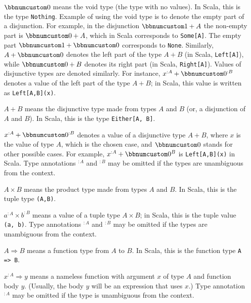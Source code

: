 $\bbnum 0$ means the void type (the type with no
values). In Scala, this is the type \lstinline!Nothing!.
Example of using the void type is to denote the empty part of a disjunction.
For example, in the disjunction $\bbnum 1+A$ the non-empty part is
$\bbnum 0+A$, which in Scala corresponds to \lstinline!Some[A]!.
The empty part $\bbnum 1+\bbnum 0$ corresponds to \lstinline!None!.
Similarly, $A+\bbnum 0$ denotes the left part of the type $A+B$
(in Scala, \lstinline!Left[A]!),
while $\bbnum 0+B$ denotes its right part (in Scala, \lstinline!Right[A]!).
Values of disjunctive types are denoted similarly. For instance, $x^{:A}+\bbnum 0^{:B}$
denotes a value of the left part of the type $A+B$; in Scala, this
value is written as \lstinline!Left[A,B](x)!.

$A+B$ means the disjunctive type made from types $A$ and $B$ (or,
a disjunction of $A$ and $B$). In Scala, this is the type \texttt{}\lstinline!Either[A, B]!.

$x^{:A}+\bbnum 0^{:B}$ denotes a value of a disjunctive type $A+B$,
where $x$ is the value of type $A$, which is the chosen case, and
$\bbnum 0$ stands for other possible cases. For example, $x^{:A}+\bbnum 0^{B}$
is \lstinline!Left[A,B](x)!
in Scala. Type annotations $^{:A}$ and $^{:B}$ may be omitted if
the types are unambiguous from the context.

$A\times B$ means the product type made from types $A$ and $B$.
In Scala, this is the tuple type \lstinline!(A,B)!.

$a^{:A}\times b^{:B}$ means a value of a tuple type $A\times B$;
in Scala, this is the tuple value \lstinline!(a, b)!.
Type annotations $^{:A}$ and $^{:B}$ may be omitted if the types
are unambiguous from the context.

$A\Rightarrow B$ means a function type from $A$ to $B$. In Scala,
this is the function type \lstinline!A => B!.

$x^{:A}\Rightarrow y$ means a nameless function with argument $x$
of type $A$ and function body $y$. (Usually, the body $y$ will
be an expression that uses $x$.) Type annotation $^{:A}$ may be
omitted if the type is unambiguous from the context.

